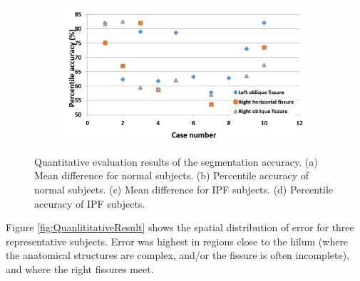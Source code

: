{\begin{figure}[htbp]
\begin{subfigure}{.6\linewidth}
  \caption{}
  \label{fig:QuantitativeResult-c} 
\end{subfigure} 
\begin{subfigure}{.6\linewidth}%
  \includegraphics[width=\linewidth,trim={{.0\wd0} {.0\wd0} {.0\wd0} {.0\wd0}},clip]{Segmentation/Image/IPFPercentileAccurancy.png}
  \caption{}
  \label{fig:QuantitativeResult-d} 
\end{subfigure}
\caption{Quantitative evaluation results of the segmentation accuracy. (a) Mean difference for normal subjects. (b) Percentile accuracy of normal subjects. (c) Mean difference for IPF subjects. (d) Percentile accuracy of IPF subjects.}
\label{fig:QuantitativeResult}
\end{figure}


Figure \ref{fig:QuanlititativeResult} shows the spatial distribution of error for three representative subjects. Error was highest in regions close to the hilum (where the anatomical structures are complex, and/or the fissure is often incomplete), and where the right fissures meet. 

}
